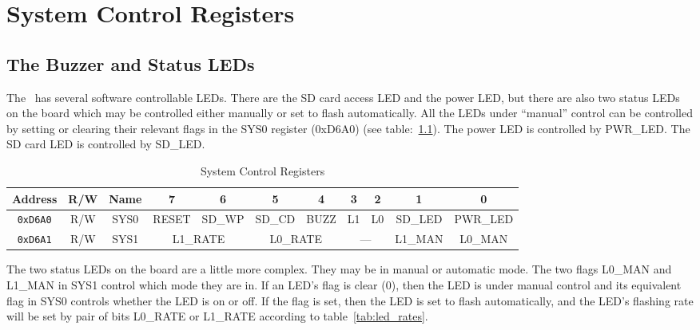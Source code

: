 \chapter{System Control Registers}

\section{The Buzzer and Status LEDs}

The \jr\ has several software controllable LEDs. There are the SD card access LED and the power LED, but there are also two status LEDs on the board which may be controlled either manually or set to flash automatically. All the LEDs under ``manual'' control can be controlled by setting or clearing their relevant flags in the SYS0 register (0xD6A0) (see table:~\ref{tab:sys_ctrl_reg}). The power LED is controlled by PWR\_LED. The SD card LED is controlled by SD\_LED.

\begin{table}[h]
    \begin{center}
        \begin{tabular}{|c|c|c|c|c|c|c|c|c|c|c|} \hline
            Address & R/W & Name & 7 & 6 & 5 & 4 & 3 & 2 & 1 & 0 \\\hline\hline

            \verb+0xD6A0+ & R/W & SYS0 & RESET & SD\_WP & SD\_CD & BUZZ & L1 & L0 & SD\_LED & PWR\_LED \\ \hline
            \verb+0xD6A1+ & R/W & SYS1 & \multicolumn{2}{|c|}{L1\_RATE}
                                       & \multicolumn{2}{|c|}{L0\_RATE}
                                       & \multicolumn{2}{|c|}{---}
                                       & L1\_MAN & L0\_MAN \\ \hline
        \end{tabular}
    \end{center}
    \caption{System Control Registers}
    \label{tab:sys_ctrl_reg}
\end{table}

The two status LEDs on the board are a little more complex. They may be in manual or automatic mode. The two flags L0\_MAN and L1\_MAN in SYS1 control which mode they are in. If an LED's flag is clear (0), then the LED is under manual control and its equivalent flag in SYS0 controls whether the LED is on or off. If the flag is set, then the LED is set to flash automatically, and the LED's flashing rate will be set by pair of bits L0\_RATE or L1\_RATE according to table~\ref{tab:led_rates}.

